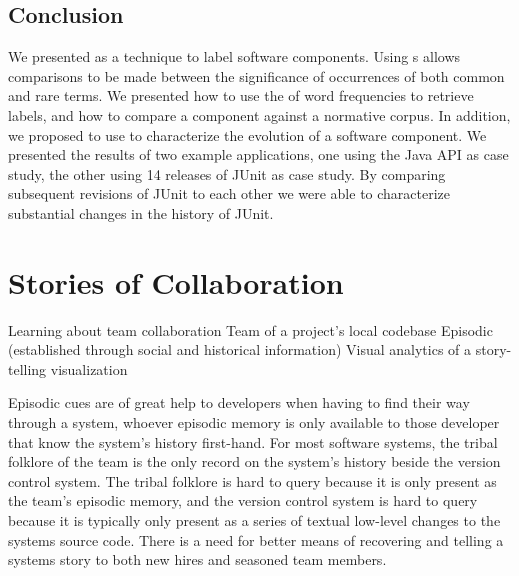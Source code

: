

\section{Conclusion}\label{eventually}

We presented \loglr as a technique to label software components. Using \loglr{}s allows comparisons to be made between the significance of occurrences of both common and rare terms. We presented how to use the \loglr of word frequencies to retrieve labels, and how to compare a component against a normative corpus. In addition, we proposed to use \loglrs to characterize the evolution of a software component. We presented the results of two example applications, one using the Java API as case study, the other using 14 releases of JUnit as case study. By comparing subsequent revisions of JUnit to each other we were able to characterize substantial changes in the history of JUnit.


\chapter{Stories of Collaboration}
\label{the chapter on chronia}

\infobox
	{Learning about team collaboration}
	{Team of a project's local codebase}
	{Episodic (established through social and historical information)}
	{Visual analytics of a story-telling visualization}

Episodic cues are of great help to developers when having to find their way through a system, whoever episodic memory is only available to those developer that know the system's history first-hand. For most software systems, the tribal folklore of the team is the only record on the system's history beside the version control system. The tribal folklore is hard to query because it is only present as the team's episodic memory, and the version control system is hard to query because it is typically only present as a series of textual low-level changes to the systems source code. There is a need for better means of recovering and telling a systems story to both new hires and seasoned team members.

